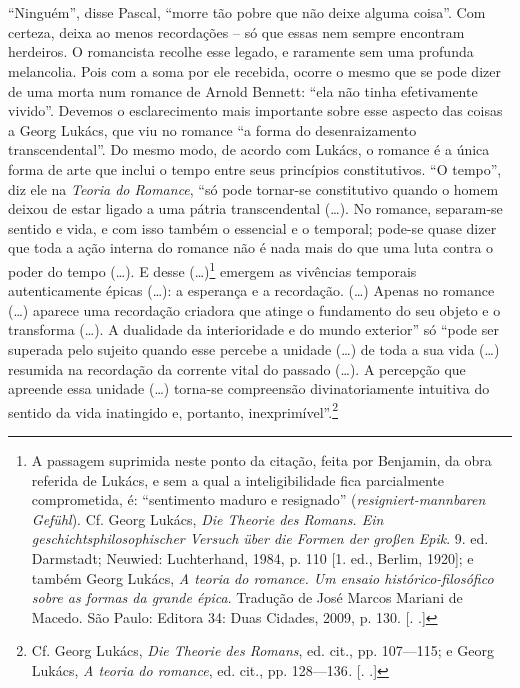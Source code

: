 \section{}

``Ninguém'', disse Pascal, ``morre tão pobre que não deixe alguma
coisa''. Com certeza, deixa ao menos recordações -- só que essas nem
sempre encontram herdeiros. O romancista recolhe esse legado, e
raramente sem uma profunda melancolia. Pois com a soma por ele recebida,
ocorre o mesmo que se pode dizer de uma morta num romance de Arnold
Bennett: ``ela não tinha efetivamente vivido''. Devemos o esclarecimento
mais importante sobre esse aspecto das coisas a Georg Lukács, que viu no
romance ``a forma do desenraizamento transcendental''. Do mesmo modo, de
acordo com Lukács, o romance é a única forma de arte que inclui o tempo
entre seus princípios constitutivos. ``O tempo'', diz ele na
\emph{Teoria do Romance}, ``só pode tornar-se constitutivo quando o
homem deixou de estar ligado a uma pátria transcendental (\ldots{}). No
romance, separam-se sentido e vida, e com isso também o essencial e o
temporal; pode-se quase dizer que toda a ação interna do romance não é
nada mais do que uma luta contra o poder do tempo (\ldots{}). E desse
(\ldots{})\footnote{A passagem suprimida neste ponto da citação, feita por
  Benjamin, da obra referida de Lukács, e sem a qual a inteligibilidade
  fica parcialmente comprometida, é: ``sentimento maduro e resignado''
  (\emph{resigniert-mannbaren Gefühl}). Cf. Georg Lukács, \emph{Die
  Theorie des Romans. Ein geschichtsphilosophischer Versuch über die
  Formen der großen Epik}. 9. ed. Darmstadt; Neuwied: Luchterhand,
  1984, p. 110 [1. ed., Berlim, 1920]; e também Georg Lukács,
  \emph{A teoria do romance. Um ensaio histórico-filosófico sobre as
  formas da grande épica}. Tradução de José Marcos Mariani de Macedo.
  São Paulo: Editora 34: Duas Cidades, 2009, p. 130. [. .]}
emergem as vivências temporais autenticamente épicas (\ldots{}): a
esperança e a recordação. (\ldots{}) Apenas no romance (\ldots{}) aparece uma
recordação criadora que atinge o fundamento do seu objeto e o transforma
(\ldots{}). A dualidade da interioridade e do mundo exterior'' só ``pode ser
superada pelo sujeito quando esse percebe a unidade (\ldots{}) de toda a sua
vida (\ldots{}) resumida na recordação da corrente vital do passado (\ldots{}). A
percepção que apreende essa unidade (\ldots{}) torna-se compreensão
divinatoriamente intuitiva do sentido da vida inatingido e, portanto,
inexprimível''.\footnote{Cf. Georg Lukács, \emph{Die Theorie des
  Romans}, ed. cit., pp. 107---115; e Georg Lukács, \emph{A teoria do
  romance}, ed. cit., pp. 128---136\emph{.} [. .]}

